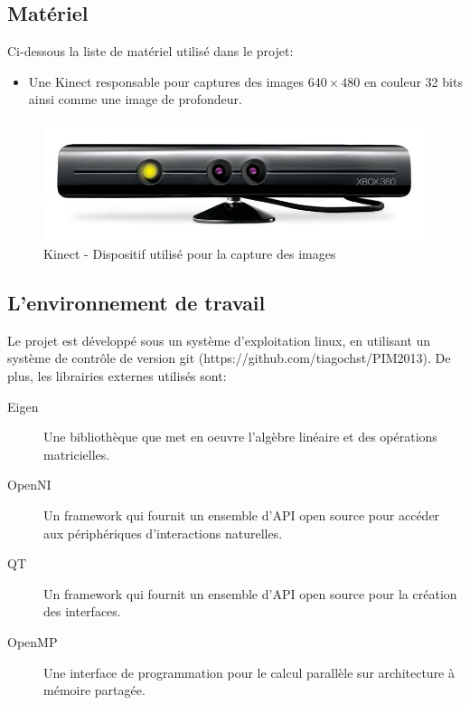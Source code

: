 \documentclass[a4paper,12pt]{article}
\begin{document}
\subsection{Matériel}

Ci-dessous la liste de matériel utilisé dans le projet: 

\begin{itemize}
\item Une Kinect responsable pour captures des images $640 \times 480$ en
  couleur 32 bits ainsi comme une image de profondeur.  
\end{itemize}

\begin{figure}[h!]
  \begin{center}
    \includegraphics[scale=0.2]{img/kinect.jpg}
    \caption{Kinect - Dispositif utilisé pour la capture des images}
  \end{center}
\end{figure}

\subsection{L'environnement de travail}

Le projet est développé sous un système d'exploitation linux, en
utilisant un système de contrôle de version git
(https://github.com/tiagochst/PIM2013).  
De plus, les librairies externes utilisés sont:

\begin{description}

\item[Eigen] Une bibliothèque que met en oeuvre l'algèbre linéaire et des opérations matricielles.\cite{Eigen}

\item[OpenNI] Un framework qui fournit un ensemble d'API open source
  pour accéder aux périphériques d'interactions naturelles.\cite{PrimeSense2010}

\item[QT] Un framework qui fournit un ensemble d'API open source
  pour la création des interfaces.\cite{QT}

\item[OpenMP] Une interface de programmation pour le calcul parallèle
  sur architecture à mémoire partagée.\cite{OpenMP} 

\end{description}
\end{document}
